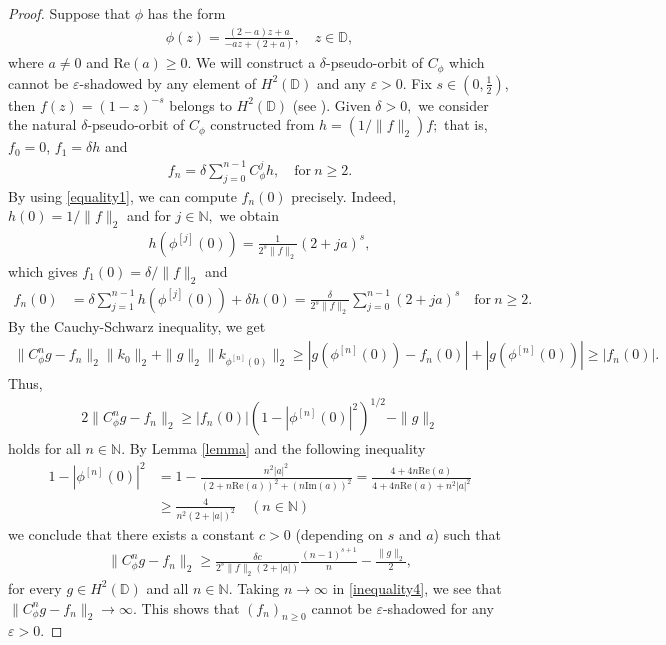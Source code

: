 \documentclass[11pt]{amsart}
\theoremstyle{plain}
\theoremstyle{remark}
\theoremstyle{plain}
\begin{document}
\begin{proof} Suppose that $\phi$ has the form 
\begin{align*}
\phi(z)=\frac{(2-a)z+a}{-az+(2+a)}, \quad z\in \mathbb{D},
\end{align*}
where $a \neq 0$ and $\mathrm{Re}(a)\geq 0.$ We will construct a $\delta$-pseudo-orbit of $C_{\phi}$ which cannot be $\varepsilon$-shadowed by any element of $H^2(\mathbb{D})$ and any $\varepsilon>0$. Fix $s\in (0, \frac{1}{2})$, then $f(z)=(1-z)^{-s}$ belongs to $H^2(\mathbb{D})$ (see \cite[Example 1.1.14]{Rosenthal_Martinez}). Given $\delta>0,$ we consider the natural $\delta$-pseudo-orbit of $C_{\phi}$ constructed from $h=(1/\|f\|_2)f;$ that is, $f_0 = 0$, $f_1= \delta h$ and 
\begin{align*}
f_n=\delta\sum_{j=0}^{n-1}C_{\phi}^{j}h, \quad \text{for} \ n\geq 2.
\end{align*}
By using \eqref{equality1}, we can compute $f_n(0)$ precisely. Indeed, $h(0)=1/\|f\|_2$ and for $j\in \mathbb{N},$ we obtain 
\begin{align*}
h(\phi^{[j]}(0))=\frac{1}{2^s\|f\|_2}(2+ja)^s,
\end{align*}
which gives $f_1(0)=\delta /\|f\|_2$ and 
\begin{align*}
f_n(0)&=\delta\sum_{j=1}^{n-1}h(\phi^{[j]}(0))+\delta h(0)= \frac{\delta}{2^s\|f\|_2} \sum_{j=0}^{n-1}(2+ja)^s\quad \text{for} \ n\geq 2.
\end{align*}
 By the Cauchy-Schwarz inequality, we get
\begin{align*}
 \|C_{\phi}^ng-f_n\|_2\|k_0\|_2+\|g\|_2\|k_{\phi^{[n]}(0)}\|_2 \geq  |g(\phi^{[n]}(0))-f_n(0)|+ |g(\phi^{[n]}(0))| \geq |f_n(0)|.
\end{align*}
Thus,  
\begin{align*}
2\|C_{\phi}^ng-f_n\|_2\geq |f_n(0)|(1-|\phi^{[n]}(0)|^2)^{1/2}  -\|g\|_2    
\end{align*}
holds for all $n\in \mathbb{N}.$ By Lemma \ref{lemma} and the following inequality
\begin{align*}
1-|\phi^{[n]}(0)|^2&=1 - \frac{n^2 |a|^2}{(2 + n \mathrm{Re}(a))^2 + (n \mathrm{Im}(a))^2} = \frac{4 + 4 n \mathrm{Re}(a)}{ 4 + 4 n \mathrm{Re}(a) + n^2 |a|^2}\\
&\geq \frac{4}{n^2(2+|a|)^2}
 \quad (n\in \mathbb{N})
\end{align*}
we conclude that there exists a constant $c >0$ (depending on $s$ and $a$) such that
\begin{align}\label{inequality4}
\|C_{\phi}^ng-f_n\|_2\geq \frac{\delta c}{2^s\|f\|_2(2+|a|)}\frac{(n - 1)^{s + 1}}{n}-\frac{\|g\|_2}{2},
\end{align}
for every $g\in H^2(\mathbb{D})$ and all $n\in \mathbb{N}.$ Taking $n\to \infty$ in \eqref{inequality4}, we see that $\|C_{\phi}^ng-f_n\|_2\to \infty.$ This shows that $(f_n)_{n \geq 0}$ cannot be $\varepsilon$-shadowed for any $\varepsilon>0.$
\end{proof}
\end{document}
